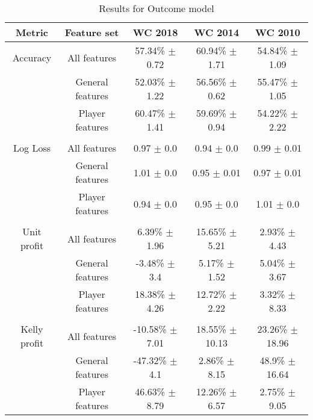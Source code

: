 \begin{table}
    \caption{Results for Outcome model}
    \begin{tabular}{| c  c| c| c| c|}
        \hline
        Metric& Feature set & \textbf{WC 2018} & \textbf{WC 2014} & \textbf{WC 2010}\\
        \hline
        Accuracy & All features & 57.34\% $\pm$ 0.72 & 60.94\% $\pm$ 1.71 & 54.84\% $\pm$ 1.09 \\
 & General features & 52.03\% $\pm$ 1.22 & 56.56\% $\pm$ 0.62 & 55.47\% $\pm$ 1.05 \\
 & Player features & 60.47\% $\pm$ 1.41 & 59.69\% $\pm$ 0.94 & 54.22\% $\pm$ 2.22 \\
 &  & & &  \\
Log Loss & All features & 0.97 $\pm$ 0.0 & 0.94 $\pm$ 0.0 & 0.99 $\pm$ 0.01 \\
 & General features & 1.01 $\pm$ 0.0 & 0.95 $\pm$ 0.01 & 0.97 $\pm$ 0.01 \\
 & Player features & 0.94 $\pm$ 0.0 & 0.95 $\pm$ 0.0 & 1.01 $\pm$ 0.0 \\
 &  & & &  \\
Unit profit & All features & 6.39\% $\pm$ 1.96 & 15.65\% $\pm$ 5.21 & 2.93\% $\pm$ 4.43 \\
 & General features & -3.48\% $\pm$ 3.4 & 5.17\% $\pm$ 1.52 & 5.04\% $\pm$ 3.67 \\
 & Player features & 18.38\% $\pm$ 4.26 & 12.72\% $\pm$ 2.22 & 3.32\% $\pm$ 8.33 \\
 &  & & &  \\
Kelly profit & All features & -10.58\% $\pm$ 7.01 & 18.55\% $\pm$ 10.13 & 23.26\% $\pm$ 18.96 \\
 & General features & -47.32\% $\pm$ 4.1 & 2.86\% $\pm$ 8.15 & 48.9\% $\pm$ 16.64 \\
 & Player features & 46.63\% $\pm$ 8.79 & 12.26\% $\pm$ 6.57 & 2.75\% $\pm$ 9.05 \\
 \hline
    \end{tabular}
    \label{table:onevsrestresults}
\end{table}


